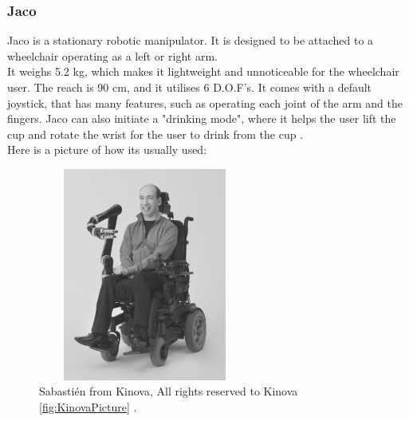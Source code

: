 \subsubsection*{Jaco}
Jaco is a stationary robotic manipulator. It is designed to be attached to a wheelchair operating as a left or right arm.\\
It weighs 5.2 kg, which makes it lightweight and unnoticeable for the wheelchair user. The reach is 90 cm, and it utilises 6 D.O.F's. It comes with a default joystick, that has many features, such as operating each joint of the arm and the fingers. Jaco can also initiate a "drinking mode", where it helps the user lift the cup and rotate the wrist for the user to drink from the cup \cite{JACO}.\\
Here is a picture of how its usually used:
\begin{figure}[H]
    \centering
    \includegraphics[width=7cm,height=7cm]{Figures/Technical_figures/Sebastien.jpg}
    \caption{Sabastién from Kinova, All rights reserved to Kinova \ref{fig:KinovaPicture} \cite{Kinova}.}
    \label{fig:Sebastién}
\end{figure}
